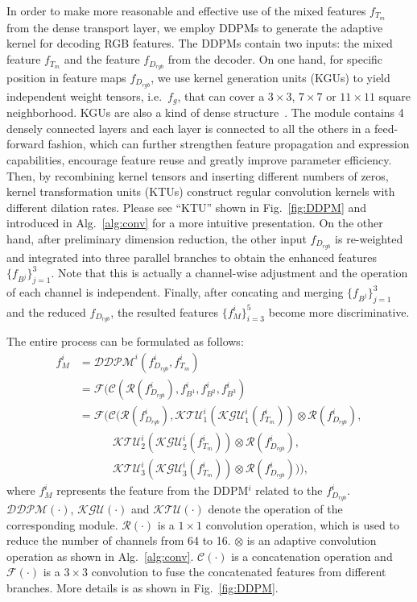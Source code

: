\documentclass[runningheads]{llncs}
\begin{document}
In order to make more reasonable and effective use of the mixed features $f_{T_m}$ from the dense transport layer, we employ DDPMs to generate the adaptive kernel for decoding RGB features. The DDPMs contain two inputs: the mixed feature $f_{T_m}$ and the feature $f_{D_{rgb}}$ from the decoder.
On one hand, for specific position in feature maps $f_{D_{rgb}}$, we use kernel generation units (KGUs) to yield independent weight tensors, i.e.\ $f_{g}$, that can cover a $3 \times 3$, $7 \times 7$ or $11 \times 11$ square neighborhood. KGUs are also a kind of dense structure~\cite{DenseNet}. The module contains 4 densely connected layers and each layer is connected to all the others in a feed-forward fashion, which can further strengthen feature propagation and expression capabilities, encourage feature reuse and greatly improve parameter efficiency. Then, by recombining kernel tensors and inserting different numbers of zeros, kernel transformation units (KTUs) construct regular convolution kernels with different dilation rates. Please see ``KTU'' shown in Fig.~\ref{fig:DDPM}
and introduced in Alg.~\ref{alg:conv} for a more intuitive presentation.
On the other hand, after preliminary dimension reduction, the other input $f_{D_{rgb}}$ is re-weighted and integrated into three parallel branches to obtain the enhanced features $\{f_{B^j}\}^3_{j=1}$. Note that this is actually a channel-wise adjustment and the operation of each channel is independent.
Finally, after concating and merging $\{f_{B^j}\}^3_{j=1}$ and the reduced $f_{D_{rgb}}$, the resulted features $\{f^{i}_{M}\}^{5}_{i=3}$ become more discriminative.

The entire process can be formulated as follows:
\begin{equation}
 \begin{split}
  f^i_{M}
  & = \mathcal{DDPM}^i(f^i_{D_{rgb}}, f^i_{T_m}) \\
  & = \mathcal{F}(\mathcal{C}(\mathcal{R}(f^i_{D_{rgb}}), f^i_{B^1}, f^i_{B^2}, f^i_{B^3}) \\
  & = \mathcal{F}(\mathcal{C}(\mathcal{R}(f^i_{D_{rgb}}),
  \mathcal{KTU}^{i}_1(\mathcal{KGU}^{i}_1(f^i_{T_m})) \otimes \mathcal{R}(f^i_{D_{rgb}}), \\
  &   \quad\quad\quad \mathcal{KTU}^{i}_2(\mathcal{KGU}^{i}_2(f^i_{T_m})) \otimes \mathcal{R}(f^i_{D_{rgb}}), \\
  &   \quad\quad\quad \mathcal{KTU}^{i}_3(\mathcal{KGU}^{i}_3(f^i_{T_m})) \otimes \mathcal{R}(f^i_{D_{rgb}}))),
 \end{split}
 \label{equ:ddpm}
\end{equation}
\noindent where $f^i_{M}$ represents the feature from the DDPM$^i$ related to the $f^i_{D_{rgb}}$.
$\mathcal{DDPM}(\cdot)$, $\mathcal{KGU}(\cdot)$ and $\mathcal{KTU}(\cdot)$ denote the operation of the corresponding module.
$\mathcal{R}(\cdot)$ is a $1 \times 1$ convolution operation, which is used to reduce the number of channels from 64 to 16. $\otimes$ is an adaptive convolution operation as shown in Alg.~\ref{alg:conv}.
$\mathcal{C}(\cdot)$ is a concatenation operation and $\mathcal{F}(\cdot)$ is a $3 \times 3$ convolution to fuse the concatenated features from different branches. More details is as shown in Fig.~\ref{fig:DDPM}.
\end{document}
